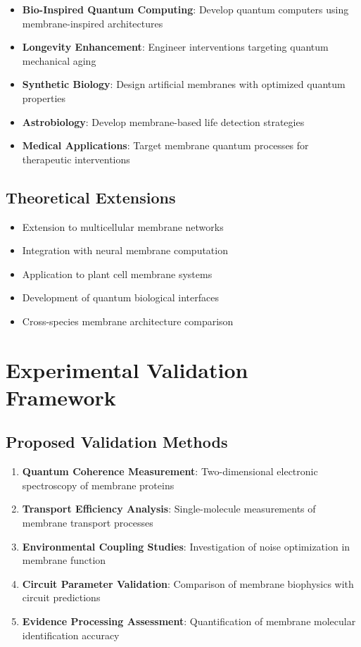 \documentclass[12pt,a4paper]{article}
\begin{document}
\begin{itemize}
\item \textbf{Bio-Inspired Quantum Computing}: Develop quantum computers using membrane-inspired architectures
\item \textbf{Longevity Enhancement}: Engineer interventions targeting quantum mechanical aging
\item \textbf{Synthetic Biology}: Design artificial membranes with optimized quantum properties
\item \textbf{Astrobiology}: Develop membrane-based life detection strategies
\item \textbf{Medical Applications}: Target membrane quantum processes for therapeutic interventions
\end{itemize}

\subsection{Theoretical Extensions}

\begin{itemize}
\item Extension to multicellular membrane networks
\item Integration with neural membrane computation
\item Application to plant cell membrane systems
\item Development of quantum biological interfaces
\item Cross-species membrane architecture comparison
\end{itemize}

\section{Experimental Validation Framework}

\subsection{Proposed Validation Methods}

\begin{enumerate}
\item \textbf{Quantum Coherence Measurement}: Two-dimensional electronic spectroscopy of membrane proteins
\item \textbf{Transport Efficiency Analysis}: Single-molecule measurements of membrane transport processes
\item \textbf{Environmental Coupling Studies}: Investigation of noise optimization in membrane function
\item \textbf{Circuit Parameter Validation}: Comparison of membrane biophysics with circuit predictions
\item \textbf{Evidence Processing Assessment}: Quantification of membrane molecular identification accuracy
\end{enumerate}
\end{document}
